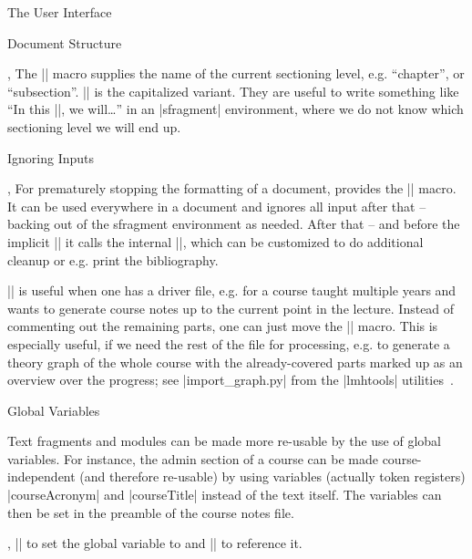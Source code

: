 \begin{sfragment}[id=sec:user]{The User Interface}
\begin{sfragment}[id=sec:user:struct]{Document Structure}
\begin{function}{\currentsectionlevel,\CurrentSectionLevel}
  The |\currentsectionlevel| macro supplies the name of the current sectioning level,
  e.g. ``chapter'', or ``subsection''. |\CurrentSectionLevel| is the capitalized
  variant. They are useful to write something like ``In this |\currentsectionlevel|, we
  will\ldots'' in an |sfragment| environment, where we do not know which sectioning level we
  will end up.
\end{function}
\end{sfragment}

\begin{sfragment}[id=sec:user:ignore]{Ignoring Inputs}

\begin{function}{\prematurestop,\afterprematurestop}
  For prematurely stopping the formatting of a document, \sTeX provides the
  |\prematurestop| macro. It can be used everywhere in a document and ignores all input
  after that -- backing out of the sfragment environment as needed. After that -- and
  before the implicit || it calls the internal |\afterprematurestop|, which
  can be customized to do additional cleanup or e.g. print the bibliography.

  |\prematurestop| is useful when one has a driver file, e.g. for a course taught multiple
  years and wants to generate course notes up to the current point in the lecture. Instead
  of commenting out the remaining parts, one can just move the |\prematurestop| macro.
  This is especially useful, if we need the rest of the file for processing, e.g. to
  generate a theory graph of the whole course with the already-covered parts marked up as
  an overview over the progress; see |import_graph.py| from the |lmhtools|
  utilities~\cite{lmhtools:github:on}.
\end{function}
\end{sfragment}

\begin{sfragment}[id=sec:user:gvars]{Global Variables}

  Text fragments and modules can be made more re-usable by the use of global
  variables. For instance, the admin section of a course can be made course-independent
  (and therefore re-usable) by using variables (actually token registers)
  |courseAcronym| and |courseTitle| instead of the text itself. The variables can then
  be set in the \sTeX preamble of the course notes file.
  
  \begin{function}{\setSGvar,\useSGvar}
    || to set the global variable  to
     and || to reference it.
  \end{function}
  

\end{sfragment}
\end{sfragment}

